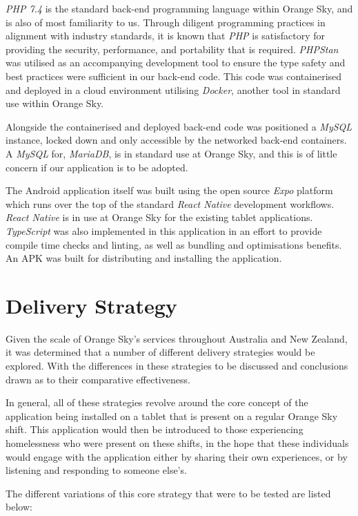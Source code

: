 \emph{PHP 7.4} is the standard back-end programming language within Orange Sky, and is also of most familiarity to us. Through diligent programming practices in alignment with industry standards, it is known that \emph{PHP} is satisfactory for providing the security, performance, and portability that is required. \emph{PHPStan} was utilised as an accompanying development tool to ensure the type safety and best practices were sufficient in our back-end code. This code was containerised and deployed in a cloud environment utilising \emph{Docker}, another tool in standard use within Orange Sky.

Alongside the containerised and deployed back-end code was positioned a \emph{MySQL} instance, locked down and only accessible by the networked back-end containers. A \emph{MySQL} for, \emph{MariaDB}, is in standard use at Orange Sky, and this is of little concern if our application is to be adopted.

The Android application itself was built using the open source \emph{Expo} platform which runs over the top of the standard \emph{React Native} development workflows. \emph{React Native} is in use at Orange Sky for the existing tablet applications. \emph{TypeScript} was also implemented in this application in an effort to provide compile time checks and linting, as well as bundling and optimisations benefits. An APK was built for distributing and installing the application.

\section{Delivery Strategy}

Given the scale of Orange Sky's services throughout Australia and New Zealand, it was determined that a number of different delivery strategies would be explored. With the differences in these strategies to be discussed and conclusions drawn as to their comparative effectiveness.

In general, all of these strategies revolve around the core concept of the application being installed on a tablet that is present on a regular Orange Sky shift. This application would then be introduced to those experiencing homelessness who were present on these shifts, in the hope that these individuals would engage with the application either by sharing their own experiences, or by listening and responding to someone else's.

The different variations of this core strategy that were to be tested are listed below:

